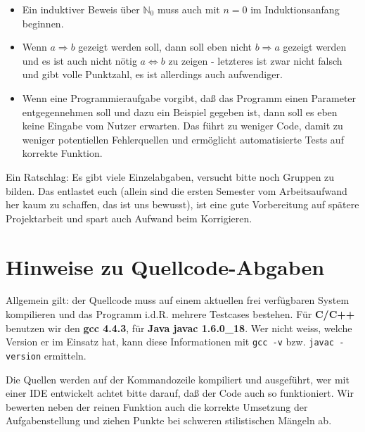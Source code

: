 \documentclass[%
	final, %
	normalheadings, %
	ngerman, %
	a4paper,
	1.1headlines, %
	pagesize, %
	halfparskip, %
	pointlessnumbers, %
	fleqn, %
]{scrartcl} %
\begin{document}
\begin{itemize}
    \item Ein induktiver Beweis über $ \mathbb{N}_0 $ muss auch mit $ n = 0 $
          im Induktionsanfang beginnen.
    \item Wenn $ a \Rightarrow b $ gezeigt werden soll, dann soll eben nicht
          $ b \Rightarrow a $ gezeigt werden und es ist auch nicht nötig
          $ a \Leftrightarrow b $ zu zeigen - letzteres ist zwar nicht falsch und
          gibt volle Punktzahl, es ist allerdings auch aufwendiger.
    \item Wenn eine Programmieraufgabe vorgibt, daß das Programm einen Parameter
          entgegennehmen soll und dazu ein Beispiel gegeben ist, dann soll es
          eben keine Eingabe vom Nutzer erwarten. Das führt zu weniger Code,
          damit zu weniger potentiellen Fehlerquellen und ermöglicht
          automatisierte Tests auf korrekte Funktion.
\end{itemize}

Ein Ratschlag: Es gibt viele Einzelabgaben, versucht bitte noch Gruppen zu bilden.
Das entlastet euch (allein sind die ersten Semester vom Arbeitsaufwand her kaum
zu schaffen, das ist uns bewusst), ist eine gute Vorbereitung auf spätere
Projektarbeit und spart auch Aufwand beim Korrigieren.

\section{Hinweise zu Quellcode-Abgaben}

Allgemein gilt: der Quellcode muss auf einem aktuellen frei verfügbaren System
kompilieren und das Programm i.d.R. mehrere Testcases bestehen.
Für \textbf{C/C++} benutzen wir den \textbf{gcc 4.4.3}, für \textbf{Java
javac 1.6.0\_18}. Wer nicht weiss, welche Version er im Einsatz hat, kann diese
Informationen mit \texttt{gcc -v} bzw. \texttt{javac -version} ermitteln.

Die Quellen werden auf der Kommandozeile kompiliert und ausgeführt, wer mit einer
IDE entwickelt achtet bitte darauf, daß der Code auch so funktioniert. Wir bewerten
neben der reinen Funktion auch die korrekte Umsetzung der Aufgabenstellung und
ziehen Punkte bei schweren stilistischen Mängeln ab.
\end{document}
